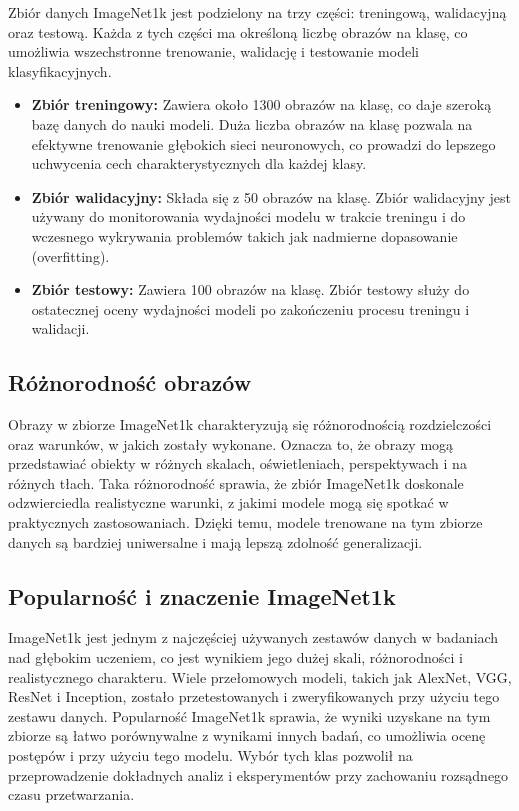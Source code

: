 Zbiór danych ImageNet1k jest podzielony na trzy części: treningową, walidacyjną oraz testową. Każda z tych części ma 
określoną liczbę obrazów na klasę, co umożliwia wszechstronne trenowanie, walidację i testowanie modeli klasyfikacyjnych.

\begin{itemize}
    \item \textbf{Zbiór treningowy:} Zawiera około 1300 obrazów na klasę, co daje szeroką bazę danych do nauki modeli. 
    Duża liczba obrazów na klasę pozwala na efektywne trenowanie głębokich sieci neuronowych, co prowadzi do lepszego 
    uchwycenia cech charakterystycznych dla każdej klasy.
    \item \textbf{Zbiór walidacyjny:} Składa się z 50 obrazów na klasę. Zbiór walidacyjny jest używany do monitorowania 
    wydajności modelu w trakcie treningu i do wczesnego wykrywania problemów takich jak nadmierne dopasowanie 
    (overfitting).
    \item \textbf{Zbiór testowy:} Zawiera 100 obrazów na klasę. Zbiór testowy służy do ostatecznej oceny wydajności 
    modeli po zakończeniu procesu treningu i walidacji.
\end{itemize}

\subsection*{Różnorodność obrazów}

Obrazy w zbiorze ImageNet1k charakteryzują się różnorodnością rozdzielczości oraz warunków, w jakich zostały wykonane. 
Oznacza to, że obrazy mogą przedstawiać obiekty w różnych skalach, oświetleniach, perspektywach i na różnych tłach. 
Taka różnorodność sprawia, że zbiór ImageNet1k doskonale odzwierciedla realistyczne warunki, z jakimi modele mogą się 
spotkać w praktycznych zastosowaniach. Dzięki temu, modele trenowane na tym zbiorze danych są bardziej uniwersalne i 
mają lepszą zdolność generalizacji. 

\subsection*{Popularność i znaczenie ImageNet1k}

ImageNet1k jest jednym z najczęściej używanych zestawów danych w badaniach nad głębokim uczeniem, co jest wynikiem 
jego dużej skali, różnorodności i realistycznego charakteru. Wiele przełomowych modeli, takich jak AlexNet, VGG, 
ResNet i Inception, zostało przetestowanych i zweryfikowanych przy użyciu tego zestawu danych. Popularność ImageNet1k 
sprawia, że wyniki uzyskane na tym zbiorze są łatwo porównywalne z wynikami innych badań, co umożliwia ocenę postępów i 
przy użyciu tego modelu. Wybór tych klas pozwolił na przeprowadzenie dokładnych analiz i eksperymentów przy zachowaniu 
rozsądnego czasu przetwarzania.


